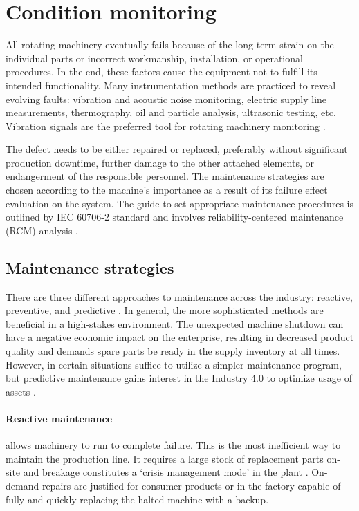 \section{Condition monitoring}
All rotating machinery eventually fails because of the long-term strain on the individual parts or incorrect workmanship, installation, or operational procedures. In the end, these factors cause the equipment not to fulfill its intended functionality. Many instrumentation methods are practiced to reveal evolving faults: vibration and acoustic noise monitoring, electric supply line measurements, thermography, oil and particle analysis, ultrasonic testing, etc. Vibration signals are the preferred tool for rotating machinery monitoring \cite{mohanty_machinery_2015}. 

The defect needs to be either repaired or replaced, preferably without significant production downtime, further damage to the other attached elements, or endangerment of the responsible personnel. The maintenance strategies are chosen according to the machine's importance as a result of its failure effect evaluation on the system. The guide to set appropriate maintenance procedures is outlined by IEC 60706-2 standard and involves reliability-centered maintenance (RCM) analysis \cite{el-thalji_predictive_2019}.

\subsection{Maintenance strategies}
There are three different approaches to maintenance across the industry: reactive, preventive, and predictive \cite{scheffer_practical_2004}. In general, the more sophisticated methods are beneficial in a high-stakes environment. The unexpected machine shutdown can have a negative economic impact on the enterprise, resulting in decreased product quality and demands spare parts be ready in the supply inventory at all times. However, in certain situations suffice to utilize a simpler maintenance program, but predictive maintenance gains interest in the Industry 4.0 to optimize usage of assets \cite{cinar_machine_2020}.

\paragraph{Reactive maintenance} allows machinery to run to complete failure. This is the most inefficient way to maintain the production line. It requires a large stock of replacement parts on-site and breakage constitutes a `crisis management mode' in the plant \cite{scheffer_practical_2004}. On-demand repairs are justified for consumer products or in the factory capable of fully and quickly replacing the halted machine with a backup. 

